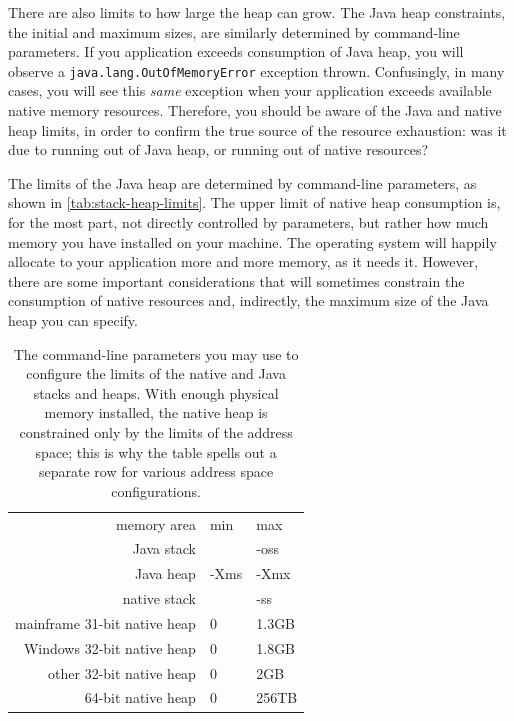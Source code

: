 There are also limits to how large the heap can grow. The Java heap constraints,
the initial and maximum sizes, are similarly determined by command-line
parameters. If you application exceeds consumption of Java heap, you will
observe a {\tt java.lang.OutOfMemoryError} exception
thrown. Confusingly, in many cases, you will
see this \emph{same} exception when your application exceeds available native
memory resources. Therefore, you should be aware of the Java and native heap
limits, in order to confirm the true source of the resource exhaustion: was it
due to running out of Java heap, or running out of native resources?

The limits of the Java heap are determined by command-line parameters, as shown
in \autoref{tab:stack-heap-limits}. The upper limit of native heap consumption
is, for the most part, not directly controlled by parameters, but rather how
much memory you have installed on your machine. The operating system will
happily allocate to your application more and more memory, as it needs it.
However, there are some important considerations that will sometimes constrain
the consumption of native resources and, indirectly, the maximum size of the
Java heap you can specify.

\begin{table}
\centering
\begin{tabular}{rll}
\toprule
memory area & min & max \\
\cmidrule(r){1-1} \cmidrule(l){2-3}
Java stack &  & -oss \\
Java heap & -Xms & -Xmx \\
native stack & & -ss \\
mainframe 31-bit native heap & 0 & 1.3GB \\
Windows 32-bit native heap & 0 & 1.8GB \\
other 32-bit native heap & 0 & 2GB \\
64-bit native heap & 0 & 256TB \\
\bottomrule
\end{tabular}
\caption{The command-line parameters you may use to configure the limits of the
native and Java stacks and heaps. With enough physical memory installed, the
native heap is constrained only by the limits of the address space; this is why
the table spells out a separate row for various address space configurations.}
\label{tab:stack-heap-limits}
\end{table}

